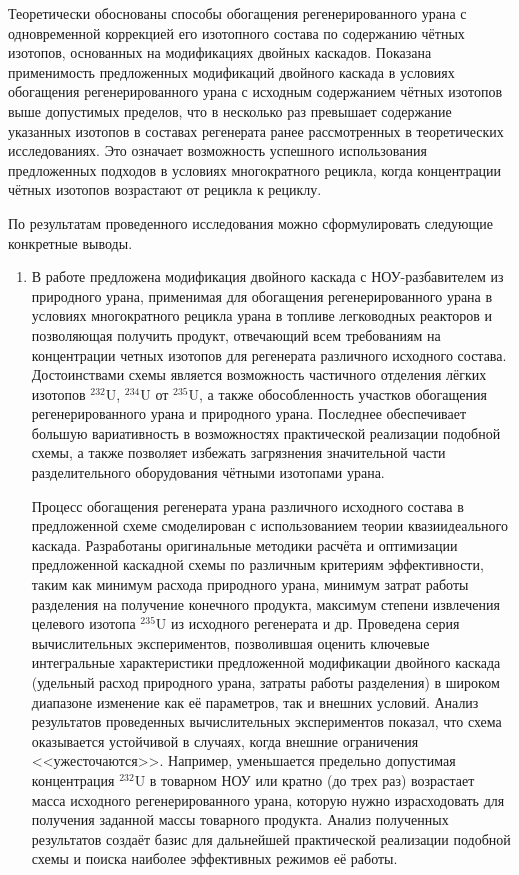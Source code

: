 Теоретически обоснованы способы обогащения регенерированного урана с одновременной коррекцией его изотопного состава по содержанию чётных изотопов, основанных на модификациях двойных каскадов. Показана применимость предложенных модификаций двойного каскада в условиях обогащения регенерированного урана с исходным содержанием чётных изотопов выше допустимых пределов, что в несколько раз превышает содержание указанных изотопов в составах регенерата ранее рассмотренных в теоретических исследованиях. Это означает возможность успешного использования предложенных подходов в условиях многократного рецикла, когда концентрации чётных изотопов возрастают от рецикла к рециклу.

По результатам проведенного исследования можно сформулировать следующие конкретные выводы.

\begin{enumerate}
\item В работе предложена модификация двойного каскада с НОУ-разбавителем из природного урана, применимая для обогащения регенерированного урана в условиях многократного рецикла урана в топливе легководных реакторов и позволяющая получить продукт, отвечающий всем требованиям на концентрации четных изотопов для регенерата различного исходного состава. Достоинствами схемы является возможность частичного отделения лёгких изотопов $^{232}$U, $^{234}$U от $^{235}$U, а также обособленность участков обогащения регенерированного урана и природного урана. Последнее обеспечивает большую вариативность в возможностях практической реализации подобной схемы, а также позволяет избежать загрязнения значительной части разделительного оборудования чётными изотопами урана.


Процесс обогащения регенерата урана различного исходного состава в предложенной схеме смоделирован с использованием теории квазиидеального каскада. Разработаны оригинальные методики расчёта и оптимизации предложенной каскадной схемы по различным критериям эффективности, таким как минимум расхода природного урана, минимум затрат работы разделения на получение конечного продукта, максимум степени извлечения целевого изотопа $^{235}$U из исходного регенерата и др. Проведена серия вычислительных экспериментов, позволившая оценить ключевые интегральные характеристики предложенной модификации двойного каскада (удельный расход природного урана, затраты работы разделения) в широком диапазоне изменение как её параметров, так и внешних условий. Анализ результатов проведенных вычислительных экспериментов показал, что схема оказывается устойчивой в случаях, когда внешние ограничения <<ужесточаются>>. Например, уменьшается предельно допустимая концентрация $^{232}$U в товарном НОУ или кратно (до трех раз) возрастает масса исходного регенерированного урана, которую нужно израсходовать для получения заданной массы товарного продукта. Анализ полученных результатов создаёт базис для дальнейшей практической реализации подобной схемы и поиска наиболее эффективных режимов её работы.


\end{enumerate}
